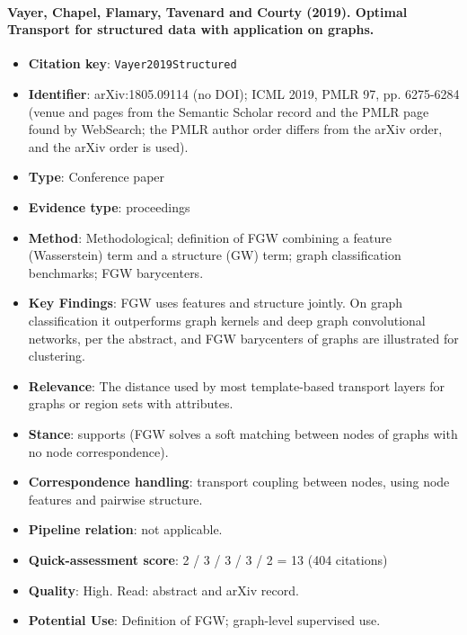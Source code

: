 \documentclass[journal,onecolumn]{IEEEtran}
\begin{document}
\paragraph{Vayer, Chapel, Flamary, Tavenard and Courty (2019). Optimal Transport for structured data with application on graphs.~\cite{Vayer2019Structured}}\mbox{}

\begin{itemize}

\item{} \textbf{Citation key}: \texttt{Vayer2019Structured}

\item{} \textbf{Identifier}: arXiv:1805.09114 (no DOI); ICML 2019, PMLR 97, pp. 6275-6284 (venue and pages from the Semantic Scholar record and the PMLR page found by WebSearch; the PMLR author order differs from the arXiv order, and the arXiv order is used).

\item{} \textbf{Type}: Conference paper

\item{} \textbf{Evidence type}: proceedings

\item{} \textbf{Method}: Methodological; definition of FGW combining a feature (Wasserstein) term and a structure (GW) term; graph classification benchmarks; FGW barycenters.

\item{} \textbf{Key Findings}: FGW uses features and structure jointly. On graph classification it outperforms graph kernels and deep graph convolutional networks, per the abstract, and FGW barycenters of graphs are illustrated for clustering.

\item{} \textbf{Relevance}: The distance used by most template-based transport layers for graphs or region sets with attributes.

\item{} \textbf{Stance}: supports (FGW solves a soft matching between nodes of graphs with no node correspondence).

\item{} \textbf{Correspondence handling}: transport coupling between nodes, using node features and pairwise structure.

\item{} \textbf{Pipeline relation}: not applicable.

\item{} \textbf{Quick-assessment score}: 2 / 3 / 3 / 3 / 2 = 13 (404 citations)

\item{} \textbf{Quality}: High. Read: abstract and arXiv record.

\item{} \textbf{Potential Use}: Definition of FGW; graph-level supervised use.

\end{itemize}
\end{document}
